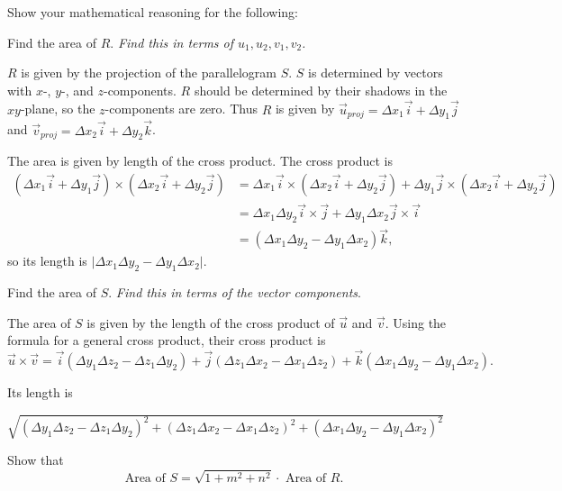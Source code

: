 \documentclass[12pt,letterpaper]{exam}
\begin{document}
\begin{questions}
\begin{parts}
Show your mathematical reasoning for the following:

\item Find the area of $R$. \emph{Find this in terms of $u_1, u_2, v_1, v_2$.}
\begin{solution}


$R$ is given by the projection of the parallelogram $S$.  $S$ is determined by vectors with $x$-, $y$-, and $z$-components.  $R$ should be determined by their shadows in the $xy$-plane, so the $z$-components are zero.  Thus $R$ is given by $\vec{u}_{proj} = \Delta x_1\vec{i} + \Delta y_1\vec{j}$ and $\vec{v}_{proj} = \Delta x_2\vec{i} + \Delta y_2\vec{k}$.

The area is given by length of the cross product.  The cross product is 
\begin{align*}
(\Delta x_1\vec{i}+\Delta y_1\vec{j})\times(\Delta x_2\vec{i}+\Delta y_2\vec{j}) &= \Delta x_1\vec{i} \times (\Delta x_2\vec{i}+\Delta y_2\vec{j})  + \Delta y_1\vec{j}\times(\Delta x_2\vec{i}+\Delta y_2\vec{j})  \\
&= \Delta x_1\Delta y_2\vec{i}\times\vec{j} + \Delta y_1\Delta x_2\vec{j}\times\vec{i} \\
&= (\Delta x_1\Delta y_2-\Delta y_1\Delta x_2)\vec{k},
\end{align*}
so its length is $\vert \Delta x_1\Delta y_2-\Delta y_1\Delta x_2\vert$.
\end{solution}

\item Find the area of $S$.  \emph{Find this in terms of the vector components}.
\begin{solution}
The area of $S$ is given by the length of the cross product of $\vec{u}$ and $\vec{v}$.  Using the formula for a general cross product, their cross product is \[\vec{u}\times\vec{v} = \vec{i}(\Delta y_1\Delta z_2 - \Delta z_1\Delta y_2) + \vec{j}(\Delta z_1\Delta x_2-\Delta x_1\Delta z_2) + \vec{k}(\Delta x_1\Delta y_2-\Delta y_1\Delta x_2).\]

Its length is 

$\sqrt{(\Delta y_1\Delta z_2 - \Delta z_1\Delta y_2)^2+(\Delta z_1\Delta x_2-\Delta x_1\Delta z_2)^2+(\Delta x_1\Delta y_2-\Delta y_1\Delta x_2)^2}$
\end{solution}

\item Show that \[\text{Area of }S = \sqrt{1+m^2+n^2}\cdot \text{ Area of }R.\]  %


\end{parts}
\end{questions}
\end{document}

